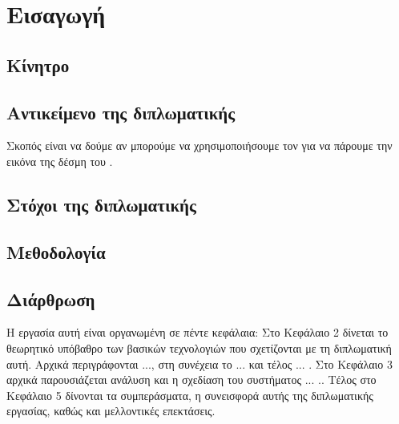 \chapter{Εισαγωγή}

\section{Κίνητρο}


\section{Αντικείμενο της διπλωματικής}
Σκοπός είναι να δούμε αν μπορούμε να χρησιμοποιήσουμε τον  για να πάρουμε την εικόνα της δέσμη του .

\section{Στόχοι της διπλωματικής}

\section{Μεθοδολογία}

\section{Διάρθρωση}
Η εργασία αυτή είναι οργανωμένη σε πέντε κεφάλαια: Στο Κεφάλαιο 2
δίνεται το θεωρητικό υπόβαθρο των βασικών τεχνολογιών που
σχετίζονται με τη διπλωματική αυτή. Αρχικά περιγράφονται ..., στη συνέχεια το ... και τέλος ... . 
Στο Κεφάλαιο 3 αρχικά παρουσιάζεται ανάλυση και η σχεδίαση του συστήματος ... .. Τέλος στο Κεφάλαιο 5 δίνονται τα συμπεράσματα, η συνεισφορά αυτής της
διπλωματικής εργασίας, καθώς και μελλοντικές επεκτάσεις.
